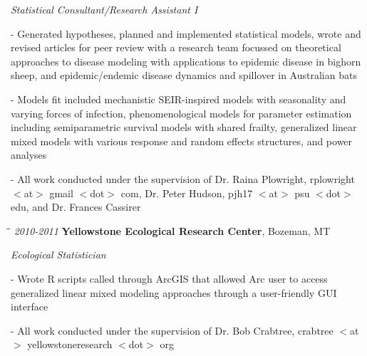 \documentclass[9pt]{article}
\newenvironment{outerlist}[1][\enskip\textbullet]%
        {\begin{itemize}[#1]}{\end{itemize}%
         }
\newenvironment{innerlist}[1][\enskip\textbullet]%
        {\begin{compactitem}[#1]}{\end{compactitem}}
\begin{document}
\begin{outerlist}
	\item[] \textit{Statistical Consultant/Research Assistant I} 
		\begin{innerlist}
						\vspace{.05in}
			\item[-] Generated hypotheses, planned and implemented statistical models, wrote and revised articles for peer review with a research team focussed on theoretical approaches to disease modeling with applications to epidemic disease in bighorn sheep, and epidemic/endemic disease dynamics and spillover in Australian bats
			\vspace{.05in}
			\item[-] Models fit included mechanistic SEIR-inspired models with seasonality and varying forces of infection, phenomenological models for parameter estimation including semiparametric survival models with shared frailty, generalized linear mixed models with various response and random effects structures, and power analyses
  \vspace{.05in}
  \item[-] All work conducted under the supervision of Dr. Raina Plowright, rplowright $<$at$>$ gmail $<$dot$>$ com, Dr. Peter Hudson, pjh17 $<$at$>$ psu $<$dot$>$ edu, and Dr. Frances Cassirer
		\end{innerlist}
	\end{outerlist}



\begin{tabbing}
\hspace*{.25cm}\=\hspace*{.25cm}\= \kill
\hspace{-1.5cm}\footnotesize{\textit{2010-2011 }} \> \textbf{Yellowstone Ecological Research Center}, 
Bozeman, MT
\end{tabbing}

\begin{outerlist}
	\item[] \textit{Ecological Statistician} 
		\begin{innerlist}
			\item[-] Wrote R scripts called through ArcGIS that allowed Arc user to access generalized linear mixed modeling approaches through a user-friendly GUI interface
      \vspace{.05in}
      \item[-] All work conducted under the supervision of Dr. Bob Crabtree, crabtree $<$at$>$ yellowstoneresearch $<$dot$>$ org
		\end{innerlist}
	\end{outerlist}
\end{document}

